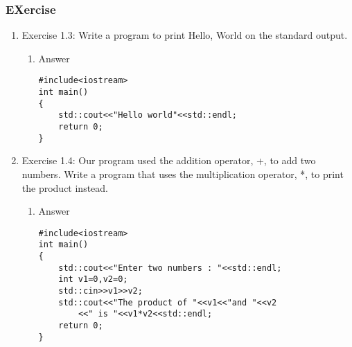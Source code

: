 \documentclass[11pt]{article}
\begin{document}
\subsubsection{EXercise}
\label{sec-1-2-7}
\begin{enumerate}
\item Exercise 1.3: Write a program to print Hello, World on the standard output.
\label{sec-1-2-7-1}
\begin{enumerate}
\item Answer
\label{sec-1-2-7-1-1}
\begin{verbatim}
#include<iostream>
int main()
{
    std::cout<<"Hello world"<<std::endl;
    return 0;
}
\end{verbatim}
\end{enumerate}
\item Exercise 1.4: Our program used the addition operator, +, to add two numbers. Write a program that uses the multiplication operator, *, to print the product instead.
\label{sec-1-2-7-2}
\begin{enumerate}
\item Answer
\label{sec-1-2-7-2-1}
\begin{verbatim}
#include<iostream>
int main()
{
    std::cout<<"Enter two numbers : "<<std::endl;
    int v1=0,v2=0;
    std::cin>>v1>>v2;
    std::cout<<"The product of "<<v1<<"and "<<v2
        <<" is "<<v1*v2<<std::endl;
    return 0;
}
\end{verbatim}
\end{enumerate}
\end{enumerate}
\end{document}
